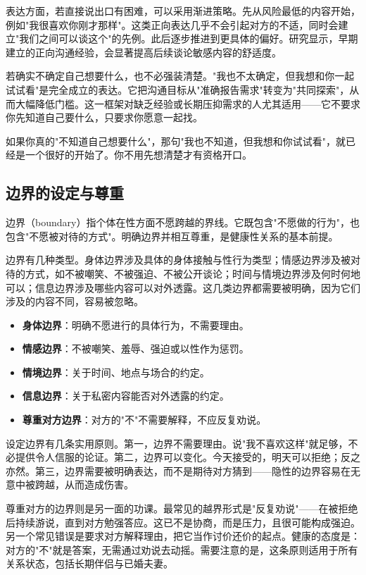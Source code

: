 \documentclass[12pt,UTF8]{ctexbook}
\newcommand{\keyword}[1]{\textbf{#1}}
\begin{document}
表达方面，若直接说出口有困难，可以采用渐进策略。先从风险最低的内容开始，例如"我很喜欢你刚才那样"。这类正向表达几乎不会引起对方的不适，同时会建立"我们之间可以谈这个"的先例。此后逐步推进到更具体的偏好。研究显示，早期建立的正向沟通经验，会显著提高后续谈论敏感内容的舒适度。

若确实不确定自己想要什么，也不必强装清楚。"我也不太确定，但我想和你一起试试看"是完全成立的表达。它把沟通目标从"准确报告需求"转变为"共同探索"，从而大幅降低门槛。这一框架对缺乏经验或长期压抑需求的人尤其适用——它不要求你先知道自己要什么，只要求你愿意一起找。

\begin{tcolorbox}[colback=pink!5!white,colframe=red!50!black,title=贴心小叮咛]
如果你真的"不知道自己想要什么"，那句"我也不知道，但我想和你试试看"，就已经是一个很好的开始了。你不用先想清楚才有资格开口。
\end{tcolorbox}

\subsection{边界的设定与尊重}

边界（boundary）指个体在性方面不愿跨越的界线。它既包含"不愿做的行为"，也包含"不愿被对待的方式"。明确边界并相互尊重，是健康性关系的基本前提。

边界有几种类型。身体边界涉及具体的身体接触与性行为类型；情感边界涉及被对待的方式，如不被嘲笑、不被强迫、不被公开谈论；时间与情境边界涉及何时何地可以；信息边界涉及哪些内容可以对外透露。这几类边界都需要被明确，因为它们涉及的内容不同，容易被忽略。

\begin{itemize}
  \item \keyword{身体边界}：明确不愿进行的具体行为，不需要理由。
  \item \keyword{情感边界}：不被嘲笑、羞辱、强迫或以性作为惩罚。
  \item \keyword{情境边界}：关于时间、地点与场合的约定。
  \item \keyword{信息边界}：关于私密内容能否对外透露的约定。
  \item \keyword{尊重对方边界}：对方的"不"不需要解释，不应反复劝说。
\end{itemize}

设定边界有几条实用原则。第一，边界不需要理由。说"我不喜欢这样"就足够，不必提供令人信服的论证。第二，边界可以变化。今天接受的，明天可以拒绝；反之亦然。第三，边界需要被明确表达，而不是期待对方猜到——隐性的边界容易在无意中被跨越，从而造成伤害。

尊重对方的边界则是另一面的功课。最常见的越界形式是"反复劝说"——在被拒绝后持续游说，直到对方勉强答应。这已不是协商，而是压力，且很可能构成强迫。另一个常见错误是要求对方解释理由，把它当作讨价还价的起点。健康的态度是：对方的"不"就是答案，无需通过劝说去动摇。需要注意的是，这条原则适用于所有关系状态，包括长期伴侣与已婚夫妻。
\end{document}
